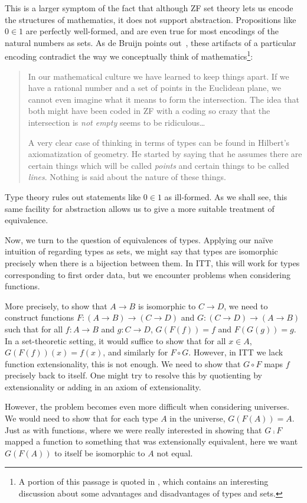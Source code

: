 \documentclass[12pt]{article}
\begin{document}
\begin{enumerate}
This is a larger symptom of the fact that although ZF set theory lets us encode
the structures of mathematics, it does not support abstraction. Propositions
like $0 \in 1$ are perfectly well-formed, and are even true for most encodings
of the natural numbers as sets. As de Bruijn points out~\cite{deBruijn95},
these artifacts of a particular encoding contradict the way we conceptually
think of mathematics\footnote{A portion of this passage is quoted in
\cite{Lamport99}, which contains an interesting discussion about some
advantages and disadvantages of types and sets.}:
%
\begin{quotation}
In our mathematical culture we have learned to keep things apart. If we have a
rational number and a set of points in the Euclidean plane, we cannot even
imagine what it means to form the intersection. The idea that both might have
been coded in ZF with a coding so crazy that the intersection is \emph{not
empty} seems to be ridiculous\dots

A very clear case of thinking in terms of types can be found in Hilbert's
axiomatization of geometry. He started by saying that he assumes there are
certain things which will be called \emph{points} and certain things to be
called \emph{lines}. Nothing is said about the nature of these things.
\end{quotation}
%
Type theory rules out statements like $0 \in 1$ as ill-formed. As we shall see,
this same facility for abstraction allows us to give a more suitable treatment
of equivalence.

\end{enumerate}

Now, we turn to the question of equivalences of types. Applying our na\"ive
intuition of regarding types as sets, we might say that types are isomorphic
precisely when there is a bijection between them. In ITT, this will work for
types corresponding to first order data, but we encounter problems when
considering functions.

More precisely, to show that $A \to B$ is isomorphic to $C \to D$, we need to
construct functions $F: (A \to B) \to (C \to D)$ and $G: (C \to D) \to (A \to
B)$ such that for all $f : A \to B$ and $g : C \to D$, $G(F(f)) = f$ and
$F(G(g)) = g$. In a set-theoretic setting, it would suffice to show that for
all $x \in A$, $G(F(f))(x) = f(x)$, and similarly for $F \circ G$. However, in
ITT we lack function extensionality, this is not enough. We need to show that
$G \circ F$ maps $f$ precisely back to itself.  One might try to resolve this
by quotienting by extensionality or adding in an axiom of extensionality.

However, the problem becomes even more difficult when considering universes.
We would need to show that for each type $A$ in the universe, $G(F(A)) = A$.
Just as with functions, where we were really interested in showing that $G
\comp F$ mapped a function to something that was extensionally equivalent, here
we want $G(F(A))$ to itself be isomorphic to $A$ not equal.



\end{document}
